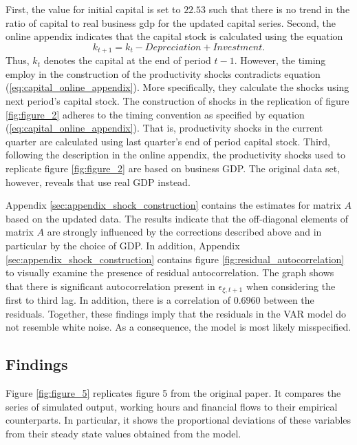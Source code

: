 First, the value for initial capital is set to $22.53$ such that there is no trend in the ratio of capital to real business gdp for the updated capital series. Second, the online appendix indicates that the capital stock is calculated using the equation
\begin{equation} 
	\label{eq:capital_online_appendix}
	k_{t+1} = k_{t} - Depreciation + Investment.
\end{equation} 
Thus, ${k}_t$ denotes the capital at the end of period $t-1$. However, the timing \citeauthor{JERMANNfinancial} employ in the construction of the productivity shocks contradicts equation (\ref{eq:capital_online_appendix}). More specifically, they  calculate the shocks using next period's capital stock. The construction of shocks in the replication of figure \ref{fig:figure_2} adheres to the timing convention as specified by equation (\ref{eq:capital_online_appendix}). That is, productivity shocks in the current quarter are calculated using last quarter's end of period capital stock. Third, following the description in the online appendix, the productivity shocks used to replicate figure \ref{fig:figure_2} are based on business GDP. The original data set, however, reveals that \citeauthor{JERMANNfinancial} use real GDP instead. 

Appendix \ref{sec:appendix_shock_construction} contains the estimates for matrix $A$ based on the updated data. The results indicate that the off-diagonal elements of matrix $A$ are strongly influenced by the corrections described above and in particular by the choice of GDP. In addition, Appendix \ref{sec:appendix_shock_construction} contains figure \ref{fig:residual_autocorrelation} to visually examine the presence of residual autocorrelation. The graph shows that there is significant autocorrelation present in ${\epsilon}_{\xi,t+1}$ when considering the first to third lag. In addition, there is a correlation of $0.6960$ between the residuals. Together, these findings imply that the residuals in the VAR model do not resemble white noise. As a consequence, the model is most likely misspecified.


\subsection{Findings}
\label{sec:findings}



Figure \ref{fig:figure_5} replicates figure 5 from the original paper. It compares  the series of simulated output, working hours and financial flows to their empirical counterparts. In particular, it shows the proportional deviations of these variables from their steady state values obtained from the model.

